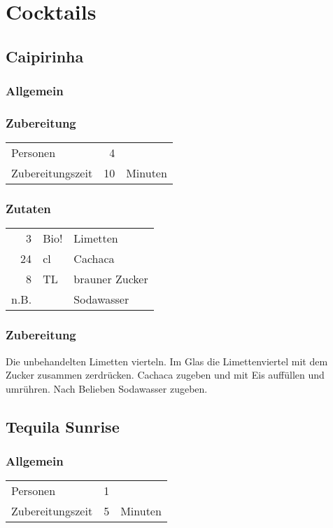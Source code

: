 \chapter{Cocktails}
\section{Caipirinha}
\subsection*{Allgemein}
\subsection*{Zubereitung}
\begin{tabular}{lrl}
	Personen         &  4 &  \\
	Zubereitungszeit & 10 & Minuten
\end{tabular} 
\subsection*{Zutaten}
\begin{tabular}{rll}
	3    & Bio! &               Limetten \\
	24   &   cl & Cachaca\index{Cachaca} \\
	8    &   TL &         brauner Zucker \\
	n.B. &      & Sodawasser
\end{tabular} 

\subsection*{Zubereitung}
Die unbehandelten Limetten vierteln. Im Glas die Limettenviertel mit dem Zucker zusammen zerdrücken. Cachaca zugeben und mit Eis auffüllen und umrühren. Nach Belieben Sodawasser zugeben.

\section{Tequila Sunrise}
\subsection*{Allgemein}
\begin{tabular}{lrl}
	Personen         &  1 &  \\
	Zubereitungszeit & 5 & Minuten
\end{tabular} 

